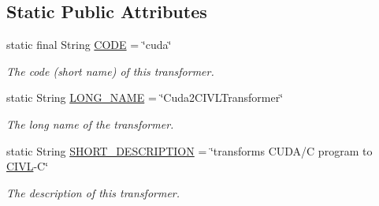 \subsection*{Static Public Attributes}
\begin{DoxyCompactItemize}
\item 
\hypertarget{classedu_1_1udel_1_1cis_1_1vsl_1_1civl_1_1transform_1_1IF_1_1Cuda2CIVLTransformer_aa6686945d0cd509e94d081720f2bae64}{}static final String \hyperlink{classedu_1_1udel_1_1cis_1_1vsl_1_1civl_1_1transform_1_1IF_1_1Cuda2CIVLTransformer_aa6686945d0cd509e94d081720f2bae64}{C\+O\+D\+E} = \char`\"{}cuda\char`\"{}\label{classedu_1_1udel_1_1cis_1_1vsl_1_1civl_1_1transform_1_1IF_1_1Cuda2CIVLTransformer_aa6686945d0cd509e94d081720f2bae64}

\begin{DoxyCompactList}\small\item\em The code (short name) of this transformer. \end{DoxyCompactList}\item 
\hypertarget{classedu_1_1udel_1_1cis_1_1vsl_1_1civl_1_1transform_1_1IF_1_1Cuda2CIVLTransformer_adafd38f2d56f0034f41f53654545c70c}{}static String \hyperlink{classedu_1_1udel_1_1cis_1_1vsl_1_1civl_1_1transform_1_1IF_1_1Cuda2CIVLTransformer_adafd38f2d56f0034f41f53654545c70c}{L\+O\+N\+G\+\_\+\+N\+A\+M\+E} = \char`\"{}Cuda2\+C\+I\+V\+L\+Transformer\char`\"{}\label{classedu_1_1udel_1_1cis_1_1vsl_1_1civl_1_1transform_1_1IF_1_1Cuda2CIVLTransformer_adafd38f2d56f0034f41f53654545c70c}

\begin{DoxyCompactList}\small\item\em The long name of the transformer. \end{DoxyCompactList}\item 
\hypertarget{classedu_1_1udel_1_1cis_1_1vsl_1_1civl_1_1transform_1_1IF_1_1Cuda2CIVLTransformer_a57f41e3f4cbaa17dbea2976a8b8b5747}{}static String \hyperlink{classedu_1_1udel_1_1cis_1_1vsl_1_1civl_1_1transform_1_1IF_1_1Cuda2CIVLTransformer_a57f41e3f4cbaa17dbea2976a8b8b5747}{S\+H\+O\+R\+T\+\_\+\+D\+E\+S\+C\+R\+I\+P\+T\+I\+O\+N} = \char`\"{}transforms C\+U\+D\+A/C program to \hyperlink{classedu_1_1udel_1_1cis_1_1vsl_1_1civl_1_1CIVL}{C\+I\+V\+L}-\/C\char`\"{}\label{classedu_1_1udel_1_1cis_1_1vsl_1_1civl_1_1transform_1_1IF_1_1Cuda2CIVLTransformer_a57f41e3f4cbaa17dbea2976a8b8b5747}

\begin{DoxyCompactList}\small\item\em The description of this transformer. \end{DoxyCompactList}\end{DoxyCompactItemize}


